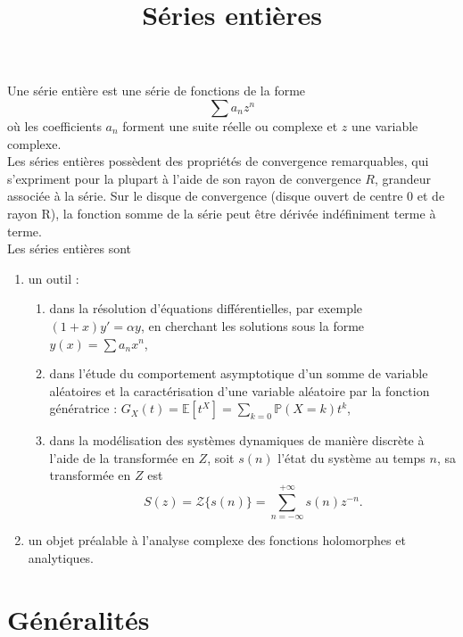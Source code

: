 \documentclass{yann}
\begin{document}
\title{Séries entières}
\maketitle



Une série entière est une série de fonctions de la forme
$$\sum a_{n}z^{n}$$
où les coefficients $a_n$ forment une suite réelle ou complexe et $z$ une variable complexe.\\
Les séries entières possèdent des propriétés de convergence remarquables, qui s'expriment pour la plupart à l'aide de son rayon de convergence $R$, grandeur associée à la série. Sur le disque de convergence (disque ouvert de centre 0 et de rayon R), la fonction somme de la série peut être dérivée indéfiniment terme à terme.\\
Les séries entières sont 
\begin{enumerate}
\item un outil :
\begin{enumerate}
\item dans la résolution d'équations différentielles, par exemple $(1 + x)y' = αy$, en cherchant les solutions sous la forme $y(x)=\sum a_{n}x^{n}$,    
\item dans l'étude du comportement asymptotique d'un somme de variable aléatoires et la caractérisation d'une variable aléatoire par la fonction génératrice : $G_X(t)=\mathbb{E}[t^X]=\sum_{k=0}\mathbb {P} (X=k)t^{k}$,
\item dans la modélisation des systèmes dynamiques de manière discrète à l'aide de la transformée en $Z$, soit $s(n)$ l'état du système au temps $n$, sa transformée en $Z$ est
$$ S(z) = \mathcal{Z}\{s(n)\} =\sum_{n=-\infty}^{+\infty}s(n)z^{-n}.$$
\end{enumerate}
\item un objet préalable à l'analyse complexe des fonctions holomorphes et analytiques.
\end{enumerate}

\tableofcontents

\section{Généralités}

\end{document}
